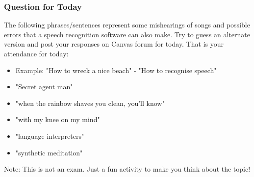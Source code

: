 \documentclass{beamer}
\begin{document}
\begin{frame}
\frametitle{Question for Today}
The following phrases/sentences represent some mishearings of songs and possible errors that a speech recognition software can also make. Try to guess an alternate version and post your responses on Canvas forum for today. That is your attendance for today:
\begin{itemize}
\item Example: "How to wreck a nice beach" - "How to recognise speech"
\item "Secret agent man" %
\item "when the rainbow shaves you clean, you'll know" %
\item "with my knee on my mind" %
\item "language interpreters" %
\item "synthetic meditation" %
\end{itemize}
Note: This is not an exam. Just a fun activity to make you think about the topic!
\end{frame}
\end{document}
